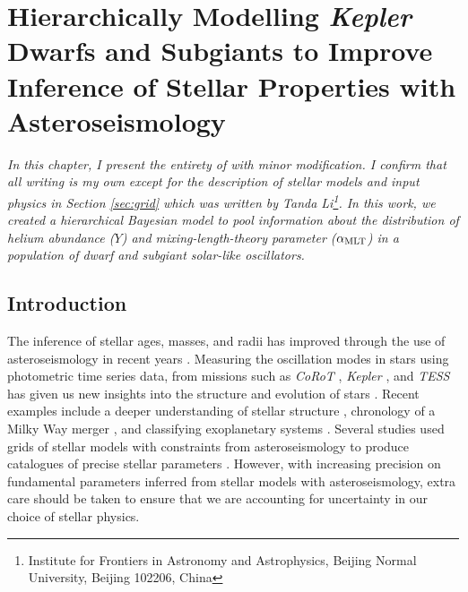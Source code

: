 %
%
%
%
%
\chapter[Hierarchically Modelling Dwarf and Subgiant Stars]{Hierarchically Modelling \emph{Kepler} Dwarfs and Subgiants to Improve Inference of Stellar Properties with Asteroseismology}\label{chap:hmd}

\textit{%
    In this chapter, I present the entirety of \citet{Lyttle.Davies.ea2021} with minor modification. I confirm that all writing is my own except for the description of stellar models and input physics in Section \ref{sec:grid} which was written by Tanda Li\footnote{Institute for Frontiers in Astronomy and Astrophysics, Beijing Normal University, Beijing 102206, China}. In this work, we created a hierarchical Bayesian model to pool information about the distribution of helium abundance (\(Y\)) and mixing-length-theory parameter (\({\alpha_\mathrm{MLT}}\)) in a population of dwarf and subgiant solar-like oscillators.
}

\section{Introduction}



The inference of stellar ages, masses, and radii has improved through the use of asteroseismology in recent years \citep[e.g. see the review by][]{Chaplin.Miglio2013}. Measuring the oscillation modes in stars using photometric time series data, from missions such as \emph{CoRoT} \citep{Baglin.Auvergne.ea2006}, \emph{Kepler} \citep{Borucki.Koch.ea2010}, and \emph{TESS} \citep{Ricker.Winn.ea2015} has given us new insights into the structure and evolution of stars \citep{Garcia.Ballot2019}. Recent examples include a deeper understanding of stellar structure \citep{Verma.Raodeo.ea2017}, chronology of a Milky Way merger \citep{Chaplin.Serenelli.ea2020}, and classifying exoplanetary systems \citep{Huber.Chaplin.ea2019, Tayar.Claytor.ea2020}. Several studies used grids of stellar models with constraints from asteroseismology to produce catalogues of precise stellar parameters \citep{Pinsonneault.Elsworth.ea2014, SilvaAguirre.Lund.ea2017}. However, with increasing precision on fundamental parameters inferred from stellar models with asteroseismology, extra care should be taken to ensure that we are accounting for uncertainty in our choice of stellar physics.

